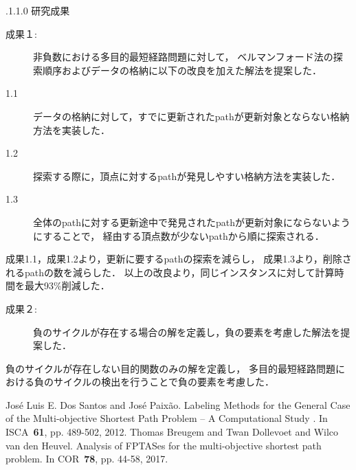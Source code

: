 \documentclass[oneside, 10pt, twocolumn]{jarticle}
\makeatletter
\def\section{\@startsection {section}{1}{\z@}{-3.5ex plus -1ex minus
-.2ex}{2.3 ex plus .2ex}{\large\bf}}
\renewcommand{\section}{
\@startsection{section}{1}{\z@}
{.1\Cvs \@plus.0\Cdp \@minus.1\Cdp}%
{.1\Cvs \@plus.1\Cdp \@minus.0\Cdp}%
{\reset@font\large\bfseries}}      %
\makeatother
\begin{document}
\section{研究成果}

\begin{description}
  \item[成果１:]
  非負数における多目的最短経路問題に対して，
  ベルマンフォード法の探索順序およびデータの格納に以下の改良を加えた解法を提案した．
\end{description}

\begin{description}
  \item[1.1]
  データの格納に対して，すでに更新されたpathが更新対象とならない格納方法を実装した．
\end{description}

\begin{description}
  \item[1.2]
  探索する際に，頂点に対するpathが発見しやすい格納方法を実装した．
\end{description}

\begin{description}
  \item[1.3]
  全体のpathに対する更新途中で発見されたpathが更新対象にならないようにすることで，
  経由する頂点数が少ないpathから順に探索される．
\end{description}

成果1.1，成果1.2より，更新に要するpathの探索を減らし，
成果1.3より，削除されるpathの数を減らした．
以上の改良より，同じインスタンスに対して計算時間を最大93\%削減した．

\begin{description}
  \item[成果２:]
  負のサイクルが存在する場合の解を定義し，負の要素を考慮した解法を提案した．
\end{description}

負のサイクルが存在しない目的関数のみの解を定義し，
多目的最短経路問題における負のサイクルの検出を行うことで負の要素を考慮した．

\begin{thebibliography}{9} %
   José Luis E. Dos Santos and José Paixão.
   Labeling Methods for the General Case of the Multi-objective
   Shortest Path Problem – A Computational Study
   . In ISCA~\textbf{61}, pp. 489-502,
   2012.
    Thomas Breugem and Twan Dollevoet and Wilco van den Heuvel.
    Analysis of FPTASes for the multi-objective shortest path problem.
    In COR~\textbf{78}, pp. 44-58,
    2017.

\end{thebibliography}
\end{document}
